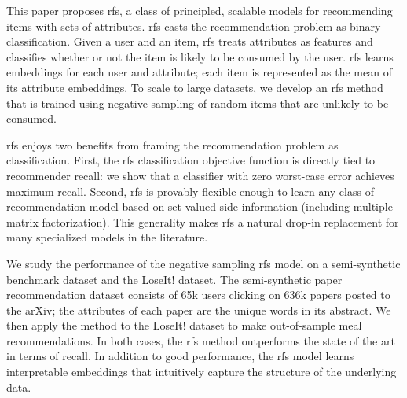 This paper proposes \gls{rfs}, a class of principled, scalable models for recommending items with sets of attributes. \gls{rfs} casts the recommendation problem as binary classification. Given a user and an item, \gls{rfs} treats attributes as features and classifies whether or not the item is likely to be consumed by the user. \gls{rfs} learns embeddings for each user and attribute; each item is represented as the mean of its attribute embeddings. To scale to large datasets, we develop an \gls{rfs} method that is trained using negative sampling of random items that are unlikely to be consumed.

\gls{rfs} enjoys two benefits from framing the recommendation problem as classification. First, the \gls{rfs} classification objective function is directly tied to recommender recall: we show that a classifier with zero worst-case error achieves maximum recall. Second, \gls{rfs} is provably flexible enough to learn any class of recommendation model based on set-valued side information (including multiple matrix factorization). This generality makes \gls{rfs} a natural drop-in replacement for many specialized models in the literature.

We study the performance of the negative sampling \gls{rfs} model on a semi-synthetic benchmark dataset and the LoseIt! dataset. The semi-synthetic paper recommendation dataset consists of 65k users clicking on 636k papers posted to the arXiv; the attributes of each paper are the unique words in its abstract. We then apply the method to the LoseIt! dataset to make out-of-sample meal recommendations. In both cases, the \gls{rfs} method outperforms the state of the art in terms of recall. In addition to good performance, the \gls{rfs} model learns interpretable embeddings that intuitively capture the structure of the underlying data.


